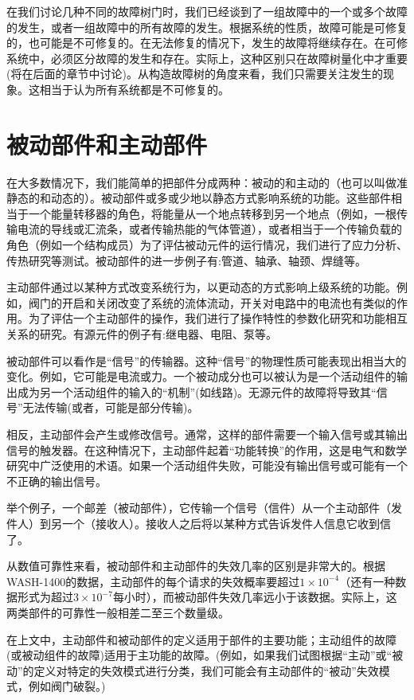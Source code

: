\documentclass[cn,11pt,chinese]{elegantbook}
\begin{document}
在我们讨论几种不同的故障树门时，我们已经谈到了一组故障中的一个或多个故障的发生，或者一组故障中的所有故障的发生。根据系统的性质，故障可能是可修复的，也可能是不可修复的。在无法修复的情况下，发生的故障将继续存在。在可修系统中，必须区分故障的发生和存在。实际上，这种区别只在故障树量化中才重要(将在后面的章节中讨论)。从构造故障树的角度来看，我们只需要关注发生的现象。这相当于认为所有系统都是不可修复的。

\section{被动部件和主动部件}

在大多数情况下，我们能简单的把部件分成两种：被动的和主动的（也可以叫做准静态的和动态的）。被动部件或多或少地以静态方式影响系统的功能。这些部件相当于一个能量转移器的角色，将能量从一个地点转移到另一个地点（例如，一根传输电流的导线或汇流条，或者传输热能的气体管道），或者相当于一个传输负载的角色（例如一个结构成员）为了评估被动元件的运行情况，我们进行了应力分析、传热研究等测试。被动部件的进一步例子有:管道、轴承、轴颈、焊缝等。

主动部件通过以某种方式改变系统行为，以更动态的方式影响上级系统的功能。例如，阀门的开启和关闭改变了系统的流体流动，开关对电路中的电流也有类似的作用。为了评估一个主动部件的操作，我们进行了操作特性的参数化研究和功能相互关系的研究。有源元件的例子有:继电器、电阻、泵等。

被动部件可以看作是“信号”的传输器。这种“信号”的物理性质可能表现出相当大的变化。例如，它可能是电流或力。一个被动成分也可以被认为是一个活动组件的输出成为另一个活动组件的输入的“机制”(如线路)。无源元件的故障将导致其“信号”无法传输(或者，可能是部分传输)。

相反，主动部件会产生或修改信号。通常，这样的部件需要一个输入信号或其输出信号的触发器。在这种情况下，主动部件起着“功能转换”的作用，这是电气和数学研究中广泛使用的术语。如果一个活动组件失败，可能没有输出信号或可能有一个不正确的输出信号。

举个例子，一个邮差（被动部件），它传输一个信号（信件）从一个主动部件（发件人）到另一个（接收人）。接收人之后将以某种方式告诉发件人信息它收到信了。

从数值可靠性来看，被动部件和主动部件的失效几率的区别是非常大的。根据WASH-1400的数据，主动部件的每个请求的失效概率要超过$1 \times 10^{-4}$（还有一种数据形式为超过$3 \times 10^{-7}$每小时），而被动部件失效几率远小于该数据。实际上，这两类部件的可靠性一般相差二至三个数量级。

在上文中，主动部件和被动部件的定义适用于部件的主要功能；主动组件的故障(或被动组件的故障)适用于主功能的故障。(例如，如果我们试图根据“主动”或“被动”的定义对特定的失效模式进行分类，我们可能会有主动部件的“被动”失效模式，例如阀门破裂。)
\end{document}
